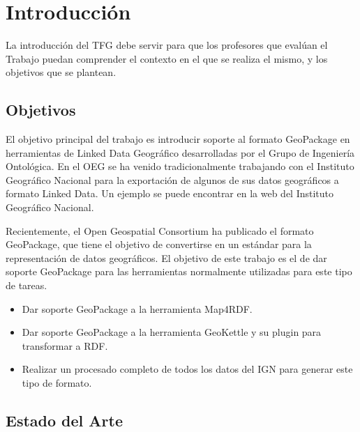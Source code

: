 \chapter{Introducción}
La introducción del TFG debe servir para que los profesores que evalúan el Trabajo puedan comprender el contexto
en el que se realiza el mismo, y los objetivos que se plantean.

\section{Objetivos} El objetivo principal del trabajo es introducir soporte al formato GeoPackage en herramientas
de Linked Data Geográfico desarrolladas por el Grupo de Ingeniería Ontológica. En el OEG se ha venido
tradicionalmente trabajando con el Instituto Geográfico Nacional para la exportación de algunos de sus datos
geográficos a formato Linked Data. Un ejemplo se puede encontrar en la web del Instituto Geográfico Nacional.
\cite{ign}

Recientemente, el Open Geospatial Consortium ha publicado el formato GeoPackage, que tiene el objetivo de
convertirse en un estándar para la representación de datos geográficos. El objetivo de este trabajo es el de dar
soporte GeoPackage para las herramientas normalmente utilizadas para este tipo de tareas.

\begin{itemize} 
    \item Dar soporte GeoPackage a la herramienta Map4RDF. 
    \item Dar soporte GeoPackage a la herramienta GeoKettle y su plugin para transformar a RDF. 
    \item Realizar un procesado completo de todos los datos del IGN para generar este tipo de formato. 
\end{itemize}

\section{Estado del Arte}

